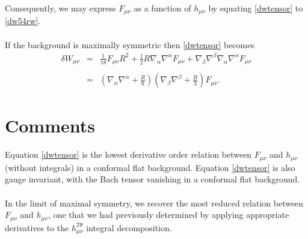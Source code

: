 \documentclass[10pt,letterpaper]{article}
\numberwithin{equation}{section}
\begin{document}
Consequently, we may express $F_{\mu\nu}$ as a function of $h_{\mu\nu}$ by equating \eqref{dwtensor} to \eqref{dw54rw}.
\\ \\
If the background is maximally symmetric then \eqref{dwtensor} becomes
\begin{eqnarray}
\delta W_{\mu\nu} &=& \tfrac{1}{18} F_{\mu \nu } R^2 + \tfrac{1}{2} R \nabla_{\alpha }\nabla^{\alpha }F_{\mu \nu } + \nabla_{\beta }\nabla^{\beta }\nabla_{\alpha }\nabla^{\alpha }F_{\mu \nu }
\\ \nonumber\\
&=& \left(\nabla_\alpha\nabla^\alpha + \frac{R}{6}\right)\left(\nabla_\beta\nabla^\beta +\frac{R}{3}\right)F_{\mu\nu}.
\end{eqnarray}
%
%
\section{Comments}
Equation \eqref{dwtensor} is the lowest derivative order relation between $F_{\mu\nu}$ and $h_{\mu\nu}$ (without integrals) in a conformal flat background. Equation \eqref{dwtensor} is also gauge invariant, with the Bach tensor vanishing in a conformal flat background.
\\ \\
In the limit of maximal symmetry, we recover the most reduced relation between $F_{\mu\nu}$ and $h_{\mu\nu}$, one that we had previously determined by applying appropriate derivatives to the $h_{\mu\nu}^{T\theta}$ integral decomposition.
\end{document}
